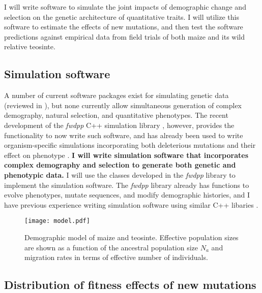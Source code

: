 I will write software to simulate the joint impacts of demographic change and selection on the genetic architecture of quantitative traits.
I will utilize this software to estimate the effects of new mutations, and then test the software predictions against empirical data from field trials of both maize and its wild relative teosinte.

\subsection{Simulation software} \label{subsec:sims}

A number of current software packages exist for simulating genetic data (reviewed in \citep{Hoban2012}), but none currently allow simultaneous generation of complex demography, natural selection, and quantitative phenotypes.
The recent development of the \emph{fwdpp} C++ simulation library \citep{Thornton2014}, however, provides the functionality to now write such software, and has already been used to write organism-specific simulations incorporating both deleterious mutations and their effect on phenotype \citep{Thornton2013}.
{\bf I will write simulation software that incorporates complex demography and selection to generate both genetic and phenotypic data.} 
I will use the classes developed in the \emph{fwdpp} library to implement the simulation software.
The \emph{fwdpp} library already has functions to evolve phenotypes, mutate sequences, and modify demographic histories, and I have previous experience writing simulation software using similar C++ libaries \citep{Ross-Ibarra2009,Hollister2010,Shi2010}. 

\begin{SCfigure}
\centering
   \texttt{[image: model.pdf]}
  \caption{Demographic model of maize and teosinte. Effective population sizes are shown as a function of the ancestral population size $N_a$ and migration rates in terms of effective number of individuals.}
  \label{fig:model}
\end{SCfigure}

\subsection{Distribution of fitness effects of new mutations} \label{subsec:DFE}

